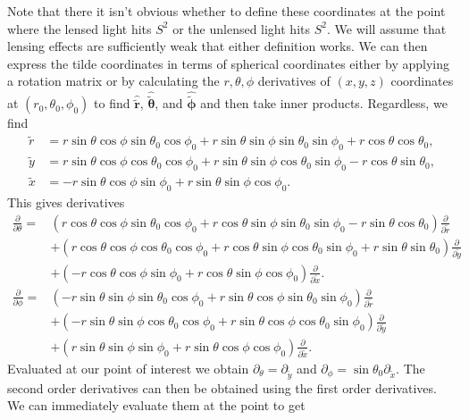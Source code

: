 \documentclass[11pt]{article} %
\begin{document}
Note that there it isn't obvious whether to define these coordinates at the point where the lensed light hits $S^2$ or the unlensed light hits $S^2$. We will assume that lensing effects are sufficiently weak that either definition works. We can then express the tilde coordinates in terms of spherical coordinates either by applying a rotation matrix or by calculating the $r, \theta, \phi$ derivatives of $(x,y,z)$ coordinates at $(r_0, \theta_0, \phi_0)$ to find $\hat{\tilde{\mathbf r}}$, $\hat{\tilde{\boldsymbol{\theta}}}$, and $\hat{\tilde{\boldsymbol{\phi}}}$ and then take inner products. Regardless, we find
\begin{align}
    \tilde r &= r\sin\theta\cos\phi\sin\theta_0\cos\phi_0+r\sin\theta\sin\phi\sin\theta_0\sin\phi_0+r\cos\theta\cos\theta_0,\\
    \tilde y &= r\sin\theta\cos\phi\cos\theta_0\cos\phi_0+r\sin\theta\sin\phi\cos\theta_0\sin\phi_0-r\cos\theta\sin\theta_0,\\
    \tilde x &= -r\sin\theta\cos\phi\sin\phi_0+r\sin\theta\sin\phi\cos\phi_0.
\end{align}
This gives derivatives
\begin{align*}
    \frac{\partial}{\partial \theta} = & \left( r \cos \theta \cos \phi \sin \theta_0 \cos \phi_0 + r \cos \theta \sin \phi \sin \theta_0 \sin \phi_0 - r \sin \theta \cos \theta_0 \right) \frac{\partial}{\partial \tilde{r}} \\
    & + \left( r \cos \theta \cos \phi \cos \theta_0 \cos \phi_0 + r \cos \theta \sin \phi \cos \theta_0 \sin \phi_0 + r \sin \theta \sin \theta_0 \right) \frac{\partial}{\partial \tilde{y}} \\
    & + \left( -r \cos \theta \cos \phi \sin \phi_0 + r \cos \theta \sin \phi \cos \phi_0 \right) \frac{\partial}{\partial \tilde{x}}.\\
    \frac{\partial}{\partial \phi} = & \left( -r \sin \theta \sin \phi \sin \theta_0 \cos \phi_0 + r \sin \theta \cos \phi \sin \theta_0 \sin \phi_0 \right) \frac{\partial}{\partial \tilde{r}} \\
& + \left( -r \sin \theta \sin \phi \cos \theta_0 \cos \phi_0 + r \sin \theta \cos \phi \cos \theta_0 \sin \phi_0 \right) \frac{\partial}{\partial \tilde{y}} \\
& + \left( r \sin \theta \sin \phi \sin \phi_0 + r \sin \theta \cos \phi \cos \phi_0 \right) \frac{\partial}{\partial \tilde{x}}.
\end{align*}
Evaluated at our point of interest we obtain $\partial_\theta=\partial_{\tilde y}$ and $\partial_\phi=\sin\theta_0\partial_{\tilde x}$. The second order derivatives can then be obtained using the first order derivatives. We can immediately evaluate them at the point to get
\end{document}
